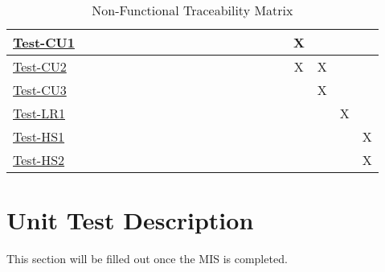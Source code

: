 \documentclass[12pt, titlepage]{article}
\begin{document}
\begin{landscape}
\begin{table}[H]
\begin{adjustwidth}{-0.3in}{-0.5in}
{\begin{tabular}{c|c|c|c|c|c|c|c|c|c|c|c|c|c|c|c|c|c|c|c|c|}
\multicolumn{1}{|l|}{\hyperref[itm:Test-CU1]{Test-CU1}}   &             &             &             &             &             &              &             &             &              &              &              &             &              &             &             &         &X&&&     \\ \hline
\multicolumn{1}{|l|}{\hyperref[itm:Test-CU2]{Test-CU2}}   &             &             &             &             &             &              &             &             &              &              &              &             &              &             &             &         &X&X&&     \\ \hline
\multicolumn{1}{|l|}{\hyperref[itm:Test-CU3]{Test-CU3}}   &             &             &             &             &             &              &             &             &              &              &              &             &              &             &             &         &&X&&     \\ \hline
\multicolumn{1}{|l|}{\hyperref[itm:Test-LR1]{Test-LR1}}   &             &             &             &             &             &              &             &             &              &              &              &             &              &             &             &         &&&X&     \\ \hline
\multicolumn{1}{|l|}{\hyperref[itm:Test-HS1]{Test-HS1}}   &             &             &             &             &             &              &             &             &              &              &              &             &              &             &             &         &&&& X    \\ \hline
\multicolumn{1}{|l|}{\hyperref[itm:Test-HS2]{Test-HS2}}   &             &             &             &             &             &              &             &             &              &              &              &             &              &             &             &         &&&& X    \\ \hline


\end{tabular}

}
\caption{Non-Functional Traceability Matrix}
    \label{tab:matrix3}
\end{adjustwidth}
\end{table}
\end{landscape}

\section{Unit Test Description}
This section will be filled out once the MIS is completed. 
\end{document}
